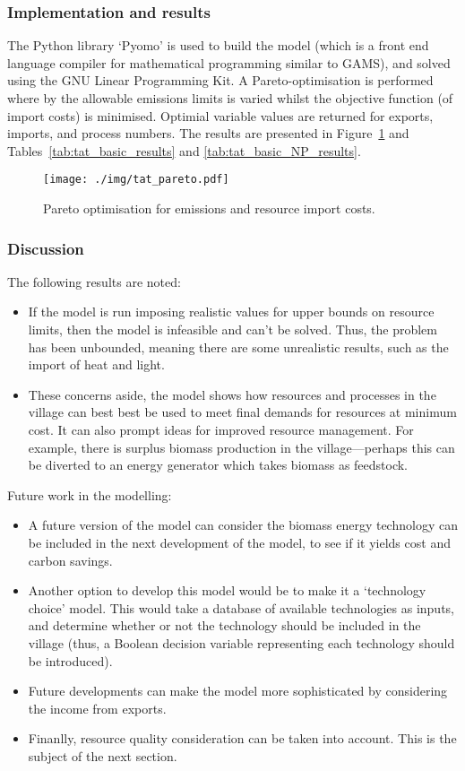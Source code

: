 \subsubsection*{Implementation and results}
The Python library `Pyomo' is used to build the model (which is a front end language compiler for mathematical programming similar to GAMS), and solved using the GNU Linear Programming Kit. A Pareto-optimisation is performed where by the allowable emissions limits is varied whilst the objective function (of import costs) is minimised. Optimial variable values are returned for exports, imports, and process numbers. The results are presented in Figure~\ref{fig:tat_pareto} and Tables~\ref{tab:tat_basic_results} and \ref{tab:tat_basic_NP_results}.
\begin{figure}
	\centering
	\texttt{[image: ./img/tat\_pareto.pdf]}
	\caption{Pareto optimisation for emissions and resource import costs.} \label{fig:tat_pareto}
\end{figure}
 
 

\subsubsection*{Discussion}
The following results are noted:
\begin{itemize}
	\item If the model is run imposing realistic values for upper bounds on resource limits, then the model is infeasible and can't be solved. Thus, the problem has been unbounded, meaning there are some unrealistic results, such as the import of heat and light. 
	\item These concerns aside, the model shows how resources and processes in the village can best best be used to meet final demands for resources at minimum cost. It can also prompt ideas for improved resource management. For example, there is surplus biomass production in the village---perhaps this can be diverted to an energy generator which takes biomass as feedstock. 
\end{itemize}	
Future work in the modelling:
\begin{itemize}
	\item A future version of the model can consider the biomass energy technology can be included in the next development of the model, to see if it yields cost and carbon savings. 
	\item Another option to develop this model would be to make it a `technology choice' model. This would take a database of available technologies as inputs, and determine whether or not the technology should be included in the village (thus, a Boolean decision variable representing each technology should be introduced).
	\item Future developments can make the model more sophisticated by considering the income from exports.
	\item Finanlly, resource quality consideration can be taken into account. This is the subject of the next section.
\end{itemize}

